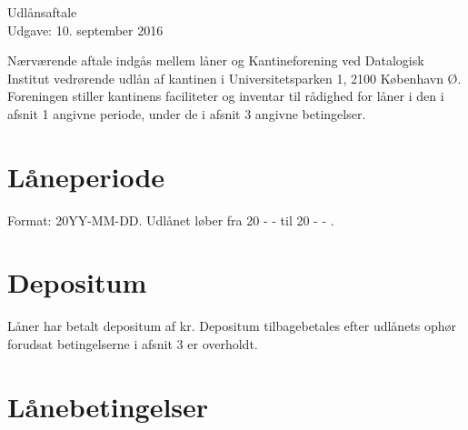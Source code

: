 \documentclass[a4paper]{article}
\begin{document}
\begin{center}
\Huge Udlånsaftale\\
\small Udgave: 10. september 2016
\end{center}

Nærværende aftale indgås mellem låner og Kantineforening ved Datalogisk Institut
vedrørende udlån af kantinen i Universitetsparken 1, 2100 København Ø.
Foreningen stiller kantinens faciliteter og inventar til rådighed for låner i
den i afsnit 1 angivne periode, under de i afsnit 3 angivne betingelser.


\section{Låneperiode}

Format: 20YY-MM-DD.  Udlånet løber fra  20 \underline{\hspace{1cm}} -
\underline{\hspace{1cm}} - \underline{\hspace{1cm}} til 20 \underline{\hspace{1cm}} -
\underline{\hspace{1cm}} - \underline{\hspace{1cm}}.


\section{Depositum}

Låner har betalt depositum af \underline{\hspace{2cm}} kr.  Depositum
tilbagebetales efter udlånets ophør forudsat betingelserne i afsnit 3 er
overholdt.


\section{Lånebetingelser}
\end{document}
